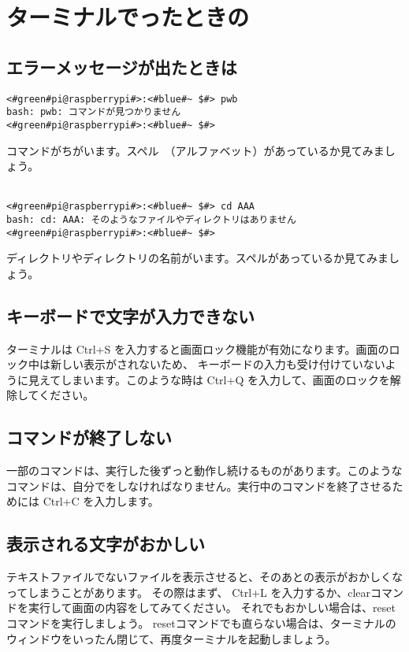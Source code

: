 \newpage
\section{ターミナルでったときの}

\subsection{エラーメッセージが出たときは}
\begin{lstlisting}[caption=コマンドがちがうときの例, label=cmdMiss]
<#green#pi@raspberrypi#>:<#blue#~ $#> pwb
bash: pwb: コマンドが見つかりません
<#green#pi@raspberrypi#>:<#blue#~ $#> 
\end{lstlisting}
コマンドがちがいます。スペル　（アルファベット）があっているか見てみましょう。\\\\

\begin{lstlisting}[caption=ディレクトリやファイルの名前がちがうときの例, label=nameMiss]
<#green#pi@raspberrypi#>:<#blue#~ $#> cd AAA
bash: cd: AAA: そのようなファイルやディレクトリはありません
<#green#pi@raspberrypi#>:<#blue#~ $#> 
\end{lstlisting}
ディレクトリやディレクトリの名前がいます。スペルがあっているか見てみましょう。\\

\subsection{キーボードで文字が入力できない}
ターミナルは Ctrl+S を入力すると画面ロック機能が有効になります。画面のロック中は新しい表示がされないため、
キーボードの入力も受け付けていないように見えてしまいます。このような時は Ctrl+Q を入力して、画面のロックを解除してください。

\subsection{コマンドが終了しない}
一部のコマンドは、実行した後ずっと動作し続けるものがあります。このようなコマンドは、自分でをしなければなりません。実行中のコマンドを終了させるためには Ctrl+C を入力します。

\subsection{表示される文字がおかしい}
テキストファイルでないファイルを表示させると、そのあとの表示がおかしくなってしまうことがあります。
その際はまず、 Ctrl+L を入力するか、clearコマンドを実行して画面の内容をしてみてください。
それでもおかしい場合は、reset コマンドを実行しましょう。
resetコマンドでも直らない場合は、ターミナルのウィンドウをいったん閉じて、再度ターミナルを起動しましょう。


